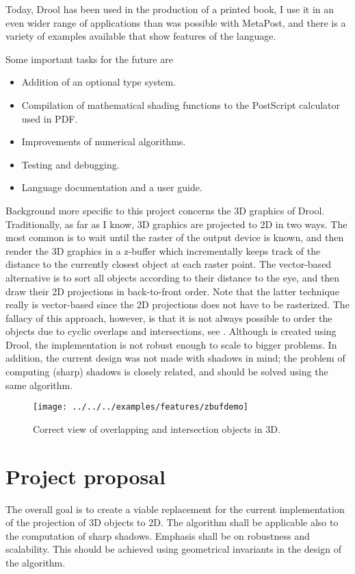 \documentclass[a4paper]{article}
\begin{document}
Today, Drool has been used in the production of a printed book, I use it in an even wider range of applications than was possible with MetaPost, and there is a variety of examples available that show features of the language.

Some important tasks for the future are
\begin{itemize}
\item Addition of an optional type system.
\item Compilation of mathematical shading functions to the PostScript calculator used in PDF.
\item Improvements of numerical algorithms.
\item Testing and debugging.
\item Language documentation and a user guide.
\end{itemize}

Background more specific to this project concerns the 3D graphics of Drool.  Traditionally, as far as I know, 3D graphics are projected to 2D in two ways.  The most common is to wait until the raster of the output device is known, and then render the 3D graphics in a z-buffer which incrementally keeps track of the distance to the currently closest object at each raster point.  The vector-based alternative is to sort all objects according to their distance to the eye, and then draw their 2D projections in back-to-front order.  Note that the latter technique really is vector-based since the 2D projections does not have to be rasterized.  The fallacy of this approach, however, is that it is not always possible to order the objects due to cyclic overlaps and intersections, see .  Although  is created using Drool, the implementation is not robust enough to scale to bigger problems.  In addition, the current design was not made with shadows in mind; the problem of computing (sharp) shadows is closely related, and should be solved using the same algorithm.

\begin{figure}[tb]
  \centering
  \texttt{[image: ../../../examples/features/zbufdemo]}
  \caption{Correct view of overlapping and intersection objects in 3D.}
\end{figure}

\section*{Project proposal}%
%
The overall goal is to create a viable replacement for the current implementation of the projection of 3D objects to 2D.  The algorithm shall be applicable also to the computation of sharp shadows.  Emphasis shall be on robustness and scalability.  This should be achieved using geometrical invariants in the design of the algorithm.
\end{document}

